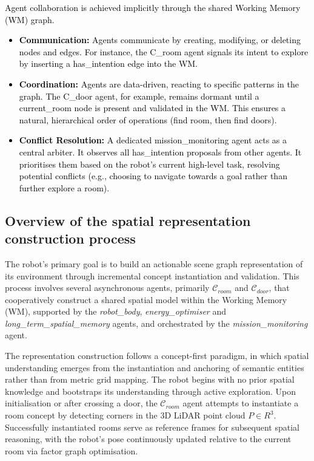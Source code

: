 \documentclass[10pt,a4paper]{article}
\begin{document}
\textcolor{black}{
Agent collaboration is achieved implicitly through the shared Working Memory (WM) graph.
\begin{itemize}
    \item \textbf{Communication:} Agents communicate by creating, modifying, or deleting nodes and edges. For instance, the C\_room agent signals its intent to explore by inserting a has\_intention edge into the WM.
    \item \textbf{Coordination:} Agents are data-driven, reacting to specific patterns in the graph. The C\_door agent, for example, remains dormant until a current\_room node is present and validated in the WM. This ensures a natural, hierarchical order of operations (find room, then find doors).
    \item \textbf{Conflict Resolution:} A dedicated mission\_monitoring agent acts as a central arbiter. It observes all has\_intention proposals from other agents. It prioritises them based on the robot's current high-level task, resolving potential conflicts (e.g., choosing to navigate towards a goal rather than further explore a room).
\end{itemize}
}

\subsection{Overview of the spatial representation construction process}

The robot's primary goal is to build an actionable scene graph representation of its environment through incremental concept instantiation and validation. This process involves several asynchronous agents, primarily $\mathcal{C}_{room}$ and $\mathcal{C}_{door}$, that cooperatively construct a shared spatial model within the Working Memory (WM), supported by the \textit{robot\_body}, \textit{energy\_optimiser} and \textit{long\_term\_spatial\_memory} agents, and orchestrated by the \textit{mission\_monitoring} agent.

The representation construction follows a concept-first paradigm, in which spatial understanding emerges from the instantiation and anchoring of semantic entities rather than from metric grid mapping. The robot begins with no prior spatial knowledge and bootstraps its understanding through active exploration. Upon initialisation or after crossing a door, the $\mathcal{C}_{room}$ agent attempts to instantiate a room concept by detecting corners in the 3D LiDAR point cloud $P \in R^3$. Successfully instantiated rooms serve as reference frames for subsequent spatial reasoning, with the robot's pose continuously updated relative to the current room via factor graph optimisation.
\end{document}
